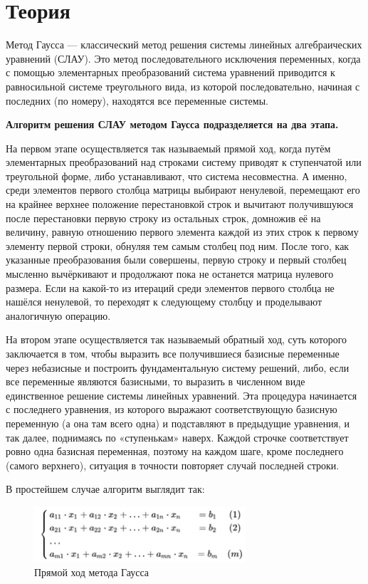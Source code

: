 \documentclass[a4paper,12pt]{article}
\begin{document}
\newpage
\section{Теория}
Метод Гаусса --- классический метод решения системы линейных алгебраических уравнений (СЛАУ). Это метод последовательного исключения переменных, когда с помощью элементарных преобразований система уравнений приводится к равносильной системе треугольного вида, из которой последовательно, начиная с последних (по номеру), находятся все переменные системы.

\textbf{Алгоритм решения СЛАУ методом Гаусса подразделяется на два этапа.}

На первом этапе осуществляется так называемый прямой ход, когда путём элементарных преобразований над строками систему приводят к ступенчатой или треугольной форме, либо устанавливают, что система несовместна. А именно, среди элементов первого столбца матрицы выбирают ненулевой, перемещают его на крайнее верхнее положение перестановкой строк и вычитают получившуюся после перестановки первую строку из остальных строк, домножив её на величину, равную отношению первого элемента каждой из этих строк к первому элементу первой строки, обнуляя тем самым столбец под ним. После того, как указанные преобразования были совершены, первую строку и первый столбец мысленно вычёркивают и продолжают пока не останется матрица нулевого размера. Если на какой-то из итераций среди элементов первого столбца не нашёлся ненулевой, то переходят к следующему столбцу и проделывают аналогичную операцию.

На втором этапе осуществляется так называемый обратный ход, суть которого заключается в том, чтобы выразить все получившиеся базисные переменные через небазисные и построить фундаментальную систему решений, либо, если все переменные являются базисными, то выразить в численном виде единственное решение системы линейных уравнений. Эта процедура начинается с последнего уравнения, из которого выражают соответствующую базисную переменную (а она там всего одна) и подставляют в предыдущие уравнения, и так далее, поднимаясь по «ступенькам» наверх. Каждой строчке соответствует ровно одна базисная переменная, поэтому на каждом шаге, кроме последнего (самого верхнего), ситуация в точности повторяет случай последней строки.

В простейшем случае алгоритм выглядит так:

\begin{figure}[H]
\centering
\includegraphics[width=0.7\textwidth]{image1.png}
\caption{Прямой ход метода Гаусса}
\end{figure}
\end{document}
